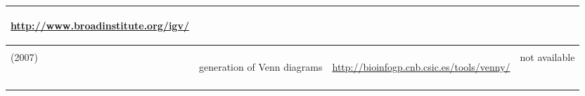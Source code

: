 \begin{singlespacing}
\begin{small}
\begin{longtable}{>{\textsf\bgroup\raggedleft\arraybackslash}p{2.7cm}<{\egroup} >{\textsf\bgroup}p{4.5cm}<{\egroup} >{\textsf\bgroup}p{4.2cm}<{\egroup}>{\textsf\bgroup}p{2.3cm}<{\egroup}}
\begin{minipage}{4.2cm}
				\url{http://www.broadinstitute.org/igv/}
			\end{minipage} 
					&  \begin{minipage}{2.3cm}
		\citet{Kent2010}
			\end{minipage} 
\tabularnewline \midrule
 \begin{minipage}{2.7cm}
				\textbf{Venny}\\
					(2007)
				\end{minipage} 
			& 	\begin{minipage}{4.5cm}
				generation of Venn diagrams
			\end{minipage} 
			&  \begin{minipage}{4.2cm}
				\url{http://bioinfogp.cnb.csic.es/tools/venny/}
			\end{minipage} 
			&  not available
\tabularnewline \bottomrule
\label{tab:tools}
\end{longtable}
\end{small}
\end{singlespacing}
